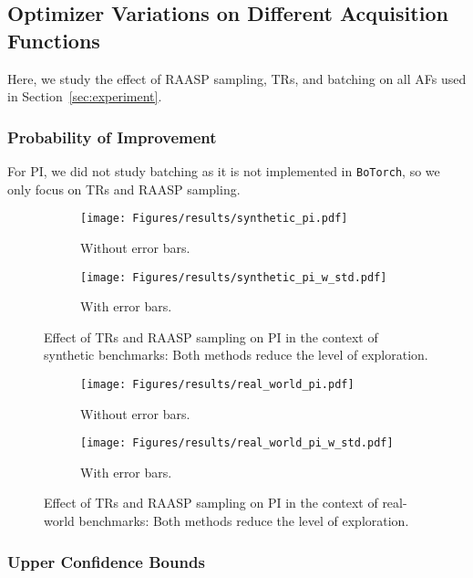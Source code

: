\documentclass[accepted]{uai2025}
\begin{document}
\subsection{Optimizer Variations on Different Acquisition Functions}
\label{app:other_af_variations}

Here, we study the effect of \ac{RAASP} sampling, \acp{TR}, and batching on all \acp{AF} used in Section~\ref{sec:experiment}.

\subsubsection{Probability of Improvement}

For \ac{PI}, we did not study batching as it is not implemented in \texttt{BoTorch}, so we only focus on \acp{TR} and \ac{RAASP} sampling.

\begin{figure}[H]
    \centering
    \begin{subfigure}{0.48\linewidth}
    \texttt{[image: Figures/results/synthetic\_pi.pdf]}
    \caption{Without error bars.}
    \end{subfigure}
    \begin{subfigure}{0.48\linewidth}
    \texttt{[image: Figures/results/synthetic\_pi\_w\_std.pdf]}
    \caption{With error bars.}
    \end{subfigure}
    \caption{Effect of \acp{TR} and \ac{RAASP} sampling on \ac{PI} in the context of synthetic benchmarks: Both methods reduce the level of exploration.}
\end{figure}

\begin{figure}[H]
    \centering
    \begin{subfigure}{0.48\linewidth}
    \texttt{[image: Figures/results/real\_world\_pi.pdf]}
    \caption{Without error bars.}
    \end{subfigure}
    \begin{subfigure}{0.48\linewidth}
    \texttt{[image: Figures/results/real\_world\_pi\_w\_std.pdf]}
    \caption{With error bars.}
    \end{subfigure}
    \caption{Effect of \acp{TR} and \ac{RAASP} sampling on \ac{PI} in the context of real-world benchmarks: Both methods reduce the level of exploration.}
\end{figure}

\subsubsection{Upper Confidence Bounds}
\end{document}
